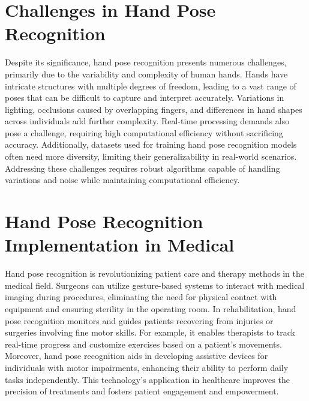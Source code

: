 \section{Challenges in Hand Pose Recognition}

Despite its significance, hand pose recognition presents numerous challenges, primarily due to the variability and complexity of human hands. Hands have intricate structures with multiple degrees of freedom, leading to a vast range of poses that can be difficult to capture and interpret accurately. Variations in lighting, occlusions caused by overlapping fingers, and differences in hand shapes across individuals add further complexity. Real-time processing demands also pose a challenge, requiring high computational efficiency without sacrificing accuracy. Additionally, datasets used for training hand pose recognition models often need more diversity, limiting their generalizability in real-world scenarios. Addressing these challenges requires robust algorithms capable of handling variations and noise while maintaining computational efficiency.

\section{Hand Pose Recognition Implementation in Medical}
Hand pose recognition is revolutionizing patient care and therapy methods in the medical field. Surgeons can utilize gesture-based systems to interact with medical imaging during procedures, eliminating the need for physical contact with equipment and ensuring sterility in the operating room. In rehabilitation, hand pose recognition monitors and guides patients recovering from injuries or surgeries involving fine motor skills. For example, it enables therapists to track real-time progress and customize exercises based on a patient's movements. Moreover, hand pose recognition aids in developing assistive devices for individuals with motor impairments, enhancing their ability to perform daily tasks independently. This technology's application in healthcare improves the precision of treatments and fosters patient engagement and empowerment.